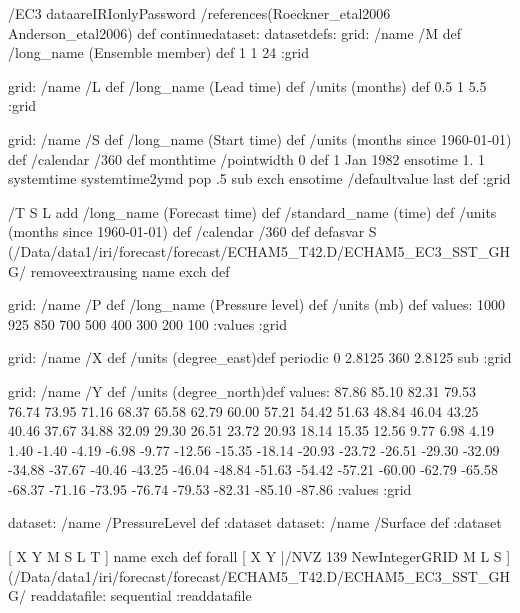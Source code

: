\begin{ingrid}
/EC3 dataareIRIonlyPassword
/references(Roeckner_etal2006 Anderson_etal2006) def
continuedataset:
datasetdefs:
grid:
/name /M def
/long_name (Ensemble member) def
1 1 24
:grid

grid:
/name /L def
/long_name (Lead time) def
/units (months) def
0.5 1 5.5
:grid

grid:
/name /S def
/long_name (Start time) def
/units (months since 1960-01-01) def
/calendar /360 def
monthtime
/pointwidth 0 def 
1 Jan 1982 ensotime
1.
1 systemtime
systemtime2ymd pop .5 sub exch
ensotime
/defaultvalue {last} def
:grid

/T { 
S L add
/long_name (Forecast time) def
/standard_name (time) def
/units (months since 1960-01-01) def
/calendar /360 def
 }defasvar
S
{
(/Data/data1/iri/forecast/forecast/ECHAM5_T42.D/ECHAM5_EC3_SST_GHG/%
} 
removeextrausing
name exch def

grid:
/name /P def
/long_name (Pressure level) def
/units (mb) def
values: 
1000 925 850 700 500 400 300 200 100
:values
:grid

grid:
/name /X def
/units (degree_east)def
 periodic
 0 2.8125 360  2.8125 sub
:grid

grid:
/name /Y def
/units (degree_north)def
values:
87.86 85.10 82.31 79.53 76.74 73.95 71.16 68.37
 65.58 62.79 60.00 57.21 54.42 51.63 48.84 46.04 43.25 40.46
 37.67 34.88 32.09 29.30 26.51 23.72 20.93 18.14 15.35 12.56
 9.77  6.98  4.19  1.40   -1.40   -4.19   -6.98   -9.77  -12.56  -15.35
 -18.14  -20.93  -23.72  -26.51  -29.30  -32.09  -34.88  -37.67  -40.46  -43.25
 -46.04  -48.84  -51.63  -54.42  -57.21  -60.00  -62.79  -65.58  -68.37  -71.16
 -73.95  -76.74  -79.53  -82.31  -85.10  -87.86
:values
:grid

dataset: /name /PressureLevel def :dataset
dataset: /name /Surface def :dataset


[ X Y M S L T ] { name exch def } forall
[ X Y |/NVZ 139  NewIntegerGRID M L S ]
(/Data/data1/iri/forecast/forecast/ECHAM5_T42.D/ECHAM5_EC3_SST_GHG/%
readdatafile:
sequential
:readdatafile


\end{ingrid}
